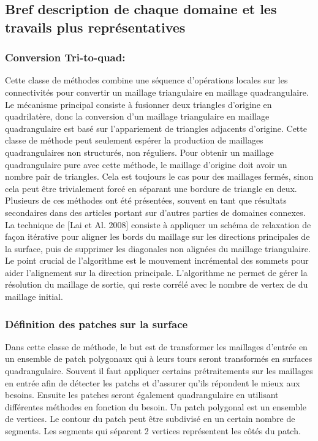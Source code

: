 \documentclass[runningheads]{llncs}
\begin{document}
\subsection{Bref description de chaque domaine et les travails plus représentatives}
\subsubsection{Conversion Tri-to-quad:}

Cette classe de méthodes combine une séquence d'opérations locales sur les connectivités pour convertir un maillage triangulaire en maillage quadrangulaire. Le mécanisme principal consiste à fusionner deux triangles d’origine en quadrilatère, donc la conversion d’un maillage triangulaire en maillage quadrangulaire est basé sur l’appariement de triangles adjacents d’origine. Cette classe de méthode peut seulement espérer la production de maillages quadrangulaires non structurés, non réguliers. Pour obtenir un maillage quadrangulaire pure avec cette méthode, le maillage d’origine doit avoir un nombre pair de triangles. Cela est toujours le cas pour des maillages fermés, sinon cela peut être trivialement forcé en séparant une bordure de triangle en deux. Plusieurs de ces méthodes ont été présentées, souvent en tant que résultats secondaires dans des articles portant sur d’autres parties de domaines connexes.
La technique de [Lai et Al. 2008]\cite{lai_incremental_2008} consiste à appliquer un schéma de relaxation de façon itérative pour aligner les bords du maillage sur les directions principales de la surface, puis de supprimer les diagonales non alignées du maillage triangulaire. Le point crucial de l’algorithme est le mouvement incrémental des sommets pour aider l’alignement sur la direction principale. L’algorithme ne permet de gérer la résolution du maillage de sortie, qui reste corrélé avec le nombre de vertex de du maillage initial. 

\subsubsection{Définition des patches sur la surface}
{Dans cette classe de méthode, le but est de transformer les maillages
d'entrée en un ensemble de patch polygonaux qui à leurs tours seront
transformés en surfaces quadrangulaire. Souvent il faut appliquer
certains prétraitements sur les maillages en entrée afin de détecter les
patchs et d'assurer qu'ils répondent le mieux aux besoins. Ensuite les
patches seront également quadrangulaire en utilisant différentes
méthodes en fonction du besoin. Un patch polygonal est un ensemble de
vertices. Le contour du patch peut être subdivisé en un certain nombre
de segments. Les segments qui séparent 2 vertices représentent les côtés
du patch.}
\end{document}
